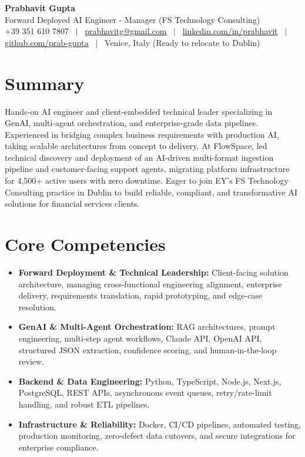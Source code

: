\documentclass[a4paper,10pt]{article}
\begin{document}
\begin{minipage}[c]{0.80\textwidth}
  {\Huge\bfseries Prabhavit Gupta}\\[3pt]
  {\color{accent}\large Forward Deployed AI Engineer - Manager (FS Technology Consulting)}\\[5pt]
  {\footnotesize +39 351 610 7807 ~$\vert$~
  \href{mailto:prabhavitg@gmail.com}{prabhavitg@gmail.com} ~$\vert$~
  \href{https://www.linkedin.com/in/prabhavit/}{linkedin.com/in/prabhavit} ~$\vert$~
  \href{https://github.com/prab-gupta}{github.com/prab-gupta} ~$\vert$~
  Venice, Italy (Ready to relocate to Dublin)}
\end{minipage}
\vspace{10pt}

\section{Summary}
Hands-on AI engineer and client-embedded technical leader specializing in GenAI, multi-agent orchestration, and enterprise-grade data pipelines. Experienced in bridging complex business requirements with production AI, taking scalable architectures from concept to delivery. At FlowSpace, led technical discovery and deployment of an AI-driven multi-format ingestion pipeline and customer-facing support agents, migrating platform infrastructure for 4,500+ active users with zero downtime. Eager to join EY's FS Technology Consulting practice in Dublin to build reliable, compliant, and transformative AI solutions for financial services clients.

\section{Core Competencies}
\begin{itemize}
  \item \textbf{Forward Deployment \& Technical Leadership:} Client-facing solution architecture, managing cross-functional engineering alignment, enterprise delivery, requirements translation, rapid prototyping, and edge-case resolution.
  \item \textbf{GenAI \& Multi-Agent Orchestration:} RAG architectures, prompt engineering, multi-step agent workflows, Claude API, OpenAI API, structured JSON extraction, confidence scoring, and human-in-the-loop review.
  \item \textbf{Backend \& Data Engineering:} Python, TypeScript, Node.js, Next.js, PostgreSQL, REST APIs, asynchronous event queues, retry/rate-limit handling, and robust ETL pipelines.
  \item \textbf{Infrastructure \& Reliability:} Docker, CI/CD pipelines, automated testing, production monitoring, zero-defect data cutovers, and secure integrations for enterprise compliance.
\end{itemize}
\end{document}

